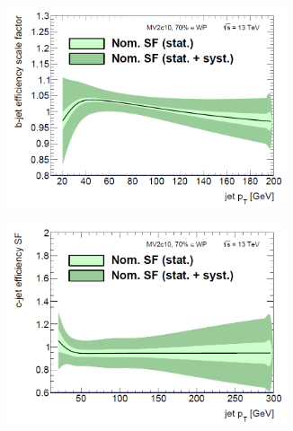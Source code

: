 \begin{figure}[h!]
\begin{subfigure}{0.5\textwidth}
  \centering
  \includegraphics[width=0.9\textwidth]{figures/Objects/BSF.png}
  \caption{}
  \label{sec:obj:fig:bSF}
\end{subfigure}
\begin{subfigure}{0.5\textwidth}
  \centering
  \includegraphics[width=0.9\textwidth]{figures/Objects/CSF.png}
  \caption{}
  \label{sec:obj:fig:cSF}
\end{subfigure}


\end{figure}
